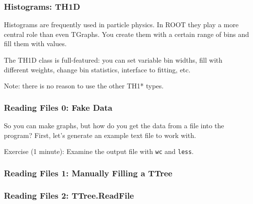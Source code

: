 \documentclass{beamer}
\begin{document}
\begin{frame}\frametitle{Histograms: TH1D}
Histograms are frequently used in particle physics. In ROOT they play a more central role than even TGraphs.  You create them with a certain range of bins and fill them with values.



The TH1D class is full-featured: you can set variable bin widths, fill with different weights, change bin statistics, interface to fitting, etc.

\tiny{Note: there is no reason to use the other TH1* types.}
\end{frame}

\begin{frame}\frametitle{Reading Files 0: Fake Data}
So you can make graphs, but how do you get the data from a file into the program?
First, let's generate an example text file to work with.


Exercise (1 minute): Examine the output file with \lstinline$wc$ and \lstinline$less$.
\label{generate}
\end{frame}

\begin{frame}\frametitle{Reading Files 1: Manually Filling a TTree}

\end{frame}

\begin{frame}\frametitle{Reading Files 2: TTree.ReadFile}

\label{convert}
\end{frame}


% 


\end{document}

